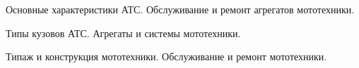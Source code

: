 \documentclass[
	14pt,
	a4paper,
	]
	{scrartcl}
\begin{document}
\vfill

\newpage


\shapk
{}
\setcounter{zad}{0}

\vfill
\z Основные характеристики АТС.
 \vfill
\z Обслуживание и ремонт агрегатов мототехники.
 \vfill

\vfill

\newpage


\shapk
{}
\setcounter{zad}{0}

\vfill
\z Типы кузовов АТС.
 \vfill
\z Агрегаты и системы мототехники.
 \vfill

\vfill

\newpage


\shapk
{}
\setcounter{zad}{0}

\vfill
\z Типаж и конструкция мототехники.
 \vfill
\z Обслуживание и ремонт мототехники.
 \vfill

\vfill

\newpage
\end{document}
